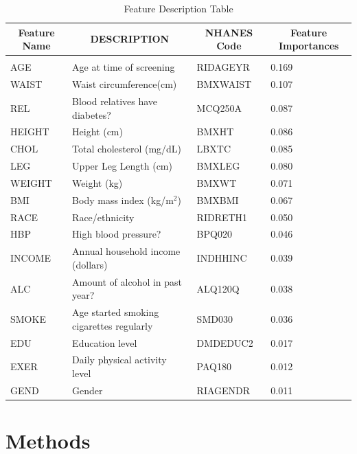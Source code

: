 \documentclass{article} %
\begin{document}
\begin{table}[h!]
\caption{Feature Description Table}
\begin{center}
\begin{tabular}{llll}
\multicolumn{1}{c}{\bf Feature Name}  &\multicolumn{1}{c}{\bf DESCRIPTION} &\multicolumn{1}{c}{\bf NHANES Code} &\multicolumn{1}{c}{\bf Feature Importances}
\\ \hline \\
AGE        &Age at time of screening & RIDAGEYR & 0.169\\
WAIST      &Waist circumference(cm) & BMXWAIST & 0.107\\
REL        &Blood relatives have diabetes? & MCQ250A & 0.087\\
HEIGHT     &Height (cm) & BMXHT & 0.086\\
CHOL       &Total cholesterol (mg/dL) & LBXTC & 0.085\\
LEG        &Upper Leg Length (cm) & BMXLEG & 0.080\\
WEIGHT     &Weight (kg) & BMXWT & 0.071\\
BMI        &Body mass index (kg/m$^2$) & BMXBMI & 0.067\\
RACE       &Race/ethnicity & RIDRETH1 & 0.050\\
HBP        &High blood pressure? & BPQ020 & 0.046\\
INCOME     &Annual household income (dollars) & INDHHINC & 0.039\\
ALC        &Amount of alcohol in past year? & ALQ120Q & 0.038\\
SMOKE      &Age started smoking cigarettes regularly & SMD030 & 0.036\\
EDU        &Education level & DMDEDUC2 & 0.017\\
EXER       &Daily physical activity level & PAQ180 & 0.012\\
GEND       &Gender & RIAGENDR & 0.011
\end{tabular}
\end{center}
\label{feature-table}
\end{table}

\section{Methods}
\end{document}
